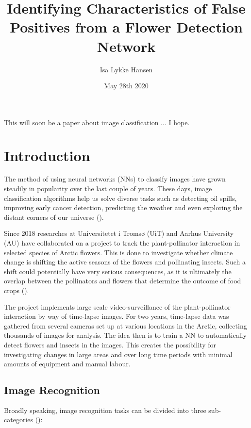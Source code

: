 \documentclass[12pt]{article}
\title{Identifying Characteristics of False Positives from a Flower Detection Network}
\author{Isa Lykke Hansen}
\date{May 28th 2020}
\begin{document}
\onehalfspacing

\begin{titlepage}
	\maketitle
	\newpage
\end{titlepage}

\abstract{}
This will soon be a paper about image classification ... I hope.
\clearpage
\tableofcontents
\clearpage

\section{Introduction}
The method of using neural networks (NNs) to classify images have grown steadily in popularity over the last couple of years. These days, image classification algorithms help us solve diverse tasks such as detecting oil spills, improving early cancer detection, predicting the weather and even exploring the distant corners of our universe (\cite{vestfalenAarhusHeleByen2019,ekiciBreastCancerDiagnosis2020,abhishekWeatherForecastingModel2012,krastevRealtimeDetectionGravitational2020}).

Since 2018 researches at Universitetet i Tromsø (UiT) and Aarhus University (AU) have collaborated on a project to track the plant-pollinator interaction in selected species of Arctic flowers. This is done to investigate whether climate change is shifting the active seasons of the flowers and pollinating insects. Such a shift could potentially have very serious consequences, as it is ultimately the overlap between the pollinators and flowers that determine the outcome of food crops (\cite{danmarksfrieforskningsfondAretsOriginaleIde2019}).

The project implements large scale video-surveillance of the plant-pollinator interaction by way of time-lapse images. For two years, time-lapse data was gathered from several cameras set up at various locations in the Arctic, collecting thousands of images for analysis. The idea then is to train a NN to automatically detect flowers and insects in the images. This creates the possibility for investigating changes in large areas and over long time periods with minimal amounts of equipment and manual labour.

\subsection{Image Recognition}
Broadly speaking, image recognition tasks can be divided into three sub-categories (\cite{C4W3L01ObjectLocalization2017}):
\end{document}
